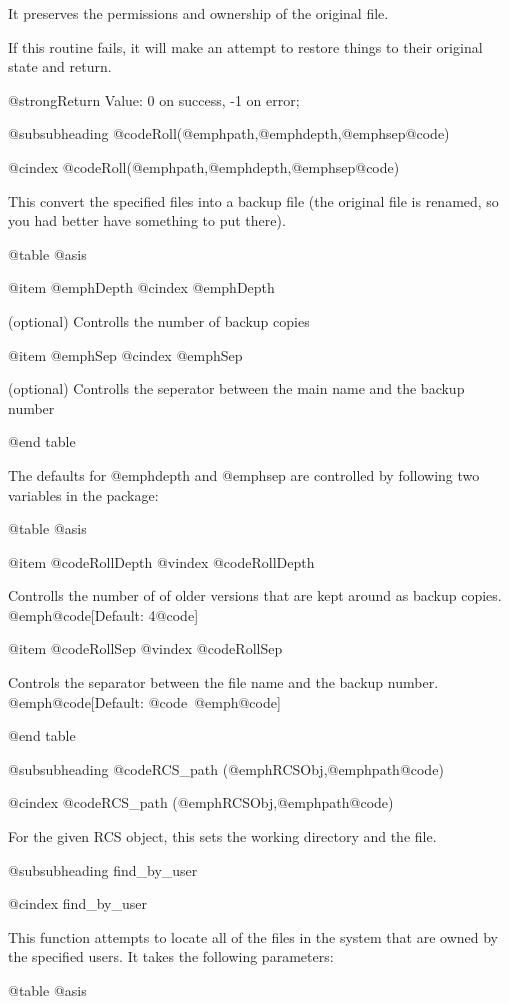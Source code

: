 It preserves the permissions and ownership of the original file.

If this routine fails, it will make an attempt to restore things to their
original state and return.

@strong{Return Value}: 0 on success, -1 on error;

@subsubheading @code{Roll(}@emph{path},@emph{depth},@emph{sep}@code{)}

@cindex @code{Roll(}@emph{path},@emph{depth},@emph{sep}@code{)}

This convert the specified files into a backup file (the original file is
renamed, so you had better have something to put there).

@table @asis

@item @emph{Depth}
@cindex @emph{Depth}

(optional) Controlls the number of backup copies

@item @emph{Sep}
@cindex @emph{Sep}

(optional) Controlls the seperator between the main name and the backup
number

@end table

The defaults for @emph{depth} and @emph{sep} are controlled by following two variables
in the package:

@table @asis

@item @code{RollDepth}
@vindex @code{RollDepth}

Controlls the number of of older versions that are kept around as backup
copies.
@emph{@code{[}Default: 4@code{]}}

@item @code{RollSep}
@vindex @code{RollSep}

Controls the separator between the file name and the backup number.
@emph{@code{[}Default: }@code{~}@emph{@code{]}}

@end table

@subsubheading @code{RCS_path (}@emph{RCSObj},@emph{path}@code{)}

@cindex @code{RCS_path (}@emph{RCSObj},@emph{path}@code{)}

For the given RCS object, this sets the working directory and the file.

@subsubheading find_by_user

@cindex find_by_user

This function attempts to locate all of the files in the system that are owned
by the specified users.  It takes the following parameters:

@table @asis

